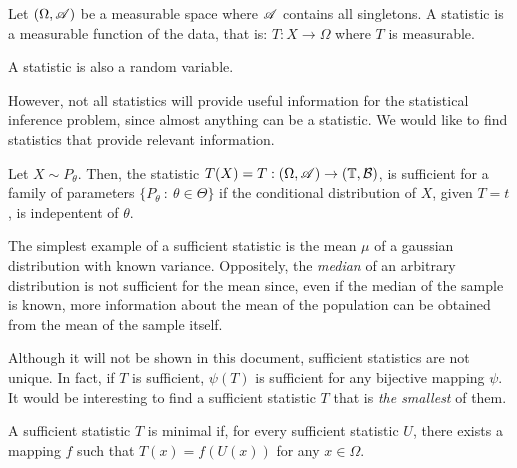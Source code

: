 \begin{ndef}
    Let $(\Omega,\mathscr{A})$ be a measurable space where $\mathscr{A}$ contains all singletons. A statistic is a measurable function of the data, that is: $T: X \to \Omega$ where $T$ is measurable.
\end{ndef}
\begin{remark}
    A statistic is also a random variable.
\end{remark}

However, not all statistics will provide useful information for the statistical inference problem, since almost anything can be a statistic. We would like to find statistics that provide relevant information.

\begin{ndef}
    Let $X \sim P_\theta$. Then, the statistic $T(X) = T : (\Omega, \mathscr{A}) \to (\mathbb T, \mathcal B)$, is sufficient for a family of parameters $\{P_\theta \ : \ \theta \in \Theta \}$ if the conditional distribution of $X$, given $T = t$, is indepentent of $\theta$.\\
\end{ndef}

\begin{nexample}
The simplest example of a sufficient statistic is the mean $\mu$ of a gaussian distribution with known variance. Oppositely, the \emph{median} of an arbitrary distribution
is not sufficient for the mean since, even if the median of the sample is known, more information about the mean of the population can be obtained from the mean of the sample itself.
\end{nexample}

Although it will not be shown in this document, sufficient statistics are not unique. In fact, if $T$ is sufficient, $\psi(T)$ is sufficient for any bijective mapping $\psi$. It would be interesting to find a sufficient statistic $T$ that is \emph{the smallest} of them.

\begin{ndef}
    A sufficient statistic $T$ is minimal if, for every sufficient statistic $U$, there exists a mapping $f$ such that $T(x) = f(U(x))$ for any $x \in \Omega$.
\end{ndef}